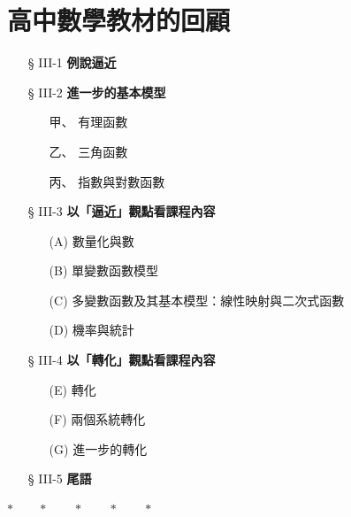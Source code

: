\section{高中數學教材的回顧}\label{sec:b6-ch3}\label{sec:b6-3}

\begin{center}
\begin{minipage}{0.75\textwidth}
\begin{itemize}[leftmargin=3em, itemsep=0.3em]
  \item[§ III-1] \textbf{例說逼近}
  \item[§ III-2] \textbf{進一步的基本模型}
  \begin{itemize}[leftmargin=2em, itemsep=0.2em]
    \item[甲、] 有理函數
    \item[乙、] 三角函數
    \item[丙、] 指數與對數函數
  \end{itemize}
  \item[§ III-3] \textbf{以「逼近」觀點看課程內容}
  \begin{itemize}[leftmargin=2em, itemsep=0.2em]
    \item[(A)] 數量化與數
    \item[(B)] 單變數函數模型
    \item[(C)] 多變數函數及其基本模型：線性映射與二次式函數
    \item[(D)] 機率與統計
  \end{itemize}
  \item[§ III-4] \textbf{以「轉化」觀點看課程內容}
  \begin{itemize}[leftmargin=2em, itemsep=0.2em]
    \item[(E)] 轉化
    \item[(F)] 兩個系統轉化
    \item[(G)] 進一步的轉化
  \end{itemize}
  \item[§ III-5] \textbf{尾語}
\end{itemize}
\end{minipage}
\end{center}

\begin{center}
$* \qquad * \qquad * \qquad * \qquad *$
\end{center}

